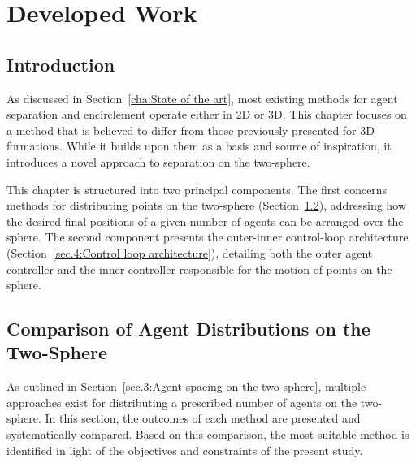
%

\chapter{Developed Work}
\label{cha:Developed Work}

\glsresetall

\section{Introduction} \label{sec.4:Introduction}
As discussed in Section~\ref{cha:State of the art}, most existing methods for agent separation and encirclement operate either in \gls{2D} or \gls{3D}. This chapter focuses on a method that is believed to differ from those previously presented for \gls{3D} formations. While it builds upon them as a basis and source of inspiration, it introduces a novel approach to separation on the two-sphere.

This chapter is structured into two principal components. The first concerns methods for distributing points on the two-sphere (Section~\ref{sec.4:Comparison of Agent Distributions on the Two-Sphere}), addressing how the desired final positions of a given number of agents can be arranged over the sphere. The second component presents the outer-inner control-loop architecture (Section~\ref{sec.4:Control loop architecture}), detailing both the outer agent controller and the inner controller responsible for the motion of points on the sphere.

\section{Comparison of Agent Distributions on the Two-Sphere} \label{sec.4:Comparison of Agent Distributions on the Two-Sphere}

As outlined in Section~\ref{sec.3:Agent spacing on the two-sphere}, multiple approaches exist for distributing a prescribed number of agents on the two-sphere. In this section, the outcomes of each method are presented and systematically compared. Based on this comparison, the most suitable method is identified in light of the objectives and constraints of the present study.


